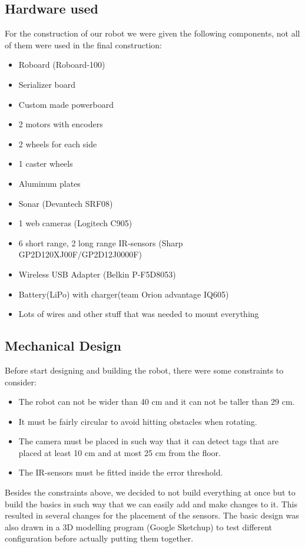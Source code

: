 \subsection{Hardware used}

For the construction of our robot we were given the following components, not all of them were used in the final construction:
\begin{itemize}
\item Roboard (Roboard-100)
\item Serializer board
\item Custom made powerboard
\item 2 motors with encoders
\item 2 wheels for each side
\item 1 caster wheels
\item Aluminum plates
\item Sonar (Devantech SRF08)
\item 1 web cameras (Logitech C905)
\item 6 short range, 2 long range IR-sensors (Sharp GP2D120XJ00F/GP2D12J0000F)
\item Wireless USB Adapter (Belkin P-F5D8053)
\item Battery(LiPo) with charger(team Orion advantage IQ605)
\item Lots of wires and other stuff that was needed to mount everything
\end{itemize}


\subsection{Mechanical Design}

Before start designing and building the robot, there were some constraints to consider:
\begin{itemize}
\item The robot can not be wider than 40 cm and it can not be taller than 29 cm.
\item It must be fairly circular to avoid hitting obstacles when rotating.
\item The camera must be placed in such way that it can detect tags that are placed at least 10 cm and at most 25 cm from the floor.
\item The IR-sensors must be fitted inside the error threshold.
\end{itemize}
Besides the constraints above, we decided to not build everything at once but to build the basics in such way that we can easily add and make changes to it. This resulted in several changes for the placement of the sensors.
The basic design was also drawn in a 3D modelling program (Google Sketchup) to test different configuration before actually putting them together.

